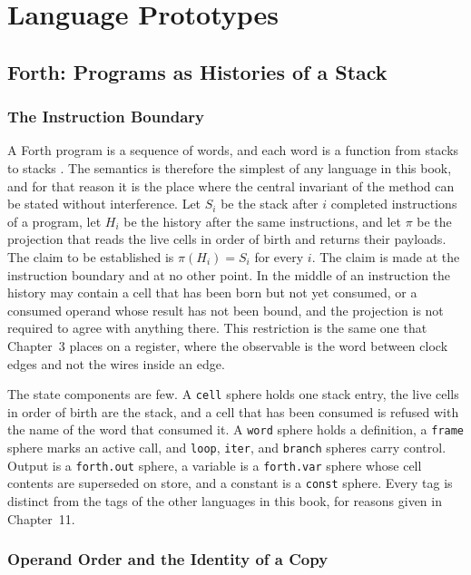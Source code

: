 \part{Language Prototypes}

\chapter{Forth: Programs as Histories of a Stack}

\section{The Instruction Boundary}

A Forth program is a sequence of words, and each word is a function from stacks to stacks \cite{moore74,brodie,ansi-forth}. The semantics is therefore the simplest of any language in this book, and for that reason it is the place where the central invariant of the method can be stated without interference. Let $S_i$ be the stack after $i$ completed instructions of a program, let $H_i$ be the \SP{} history after the same instructions, and let $\pi$ be the projection that reads the live cells in order of birth and returns their payloads. The claim to be established is $\pi(H_i)=S_i$ for every $i$. The claim is made at the instruction boundary and at no other point. In the middle of an instruction the history may contain a cell that has been born but not yet consumed, or a consumed operand whose result has not been bound, and the projection is not required to agree with anything there. This restriction is the same one that Chapter~3 places on a register, where the observable is the word between clock edges and not the wires inside an edge.

The state components are few. A \texttt{cell} sphere holds one stack entry, the live cells in order of birth are the stack, and a cell that has been consumed is refused with the name of the word that consumed it. A \texttt{word} sphere holds a definition, a \texttt{frame} sphere marks an active call, and \texttt{loop}, \texttt{iter}, and \texttt{branch} spheres carry control. Output is a \texttt{forth.out} sphere, a variable is a \texttt{forth.var} sphere whose cell contents are superseded on store, and a constant is a \texttt{const} sphere. Every tag is distinct from the tags of the other languages in this book, for reasons given in Chapter~11.

\section{Operand Order and the Identity of a Copy}

